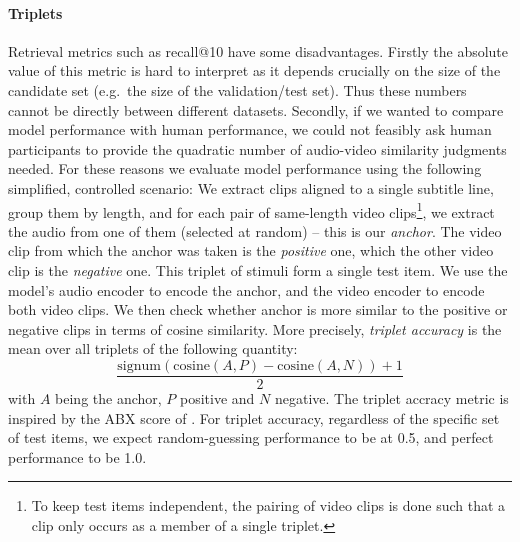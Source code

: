 \paragraph{Triplets}
Retrieval metrics such as recall@10 have some disadvantages. Firstly
the absolute value of this metric is hard to interpret as it depends
crucially on the size of the candidate set (e.g.\ the size of the
validation/test set). Thus these numbers cannot be directly between
different datasets. Secondly, if we wanted to compare model
performance with human performance, we could not feasibly ask human
participants to provide the quadratic number of audio-video similarity
judgments needed. For these reasons we evaluate model performance
using the following simplified, controlled scenario: We extract clips
aligned to a single subtitle line, group them by length, and for each
pair of same-length video clips\footnote{To keep test items
  independent, the pairing of video clips is done such that a clip
  only occurs as a member of a single triplet.}, we extract the audio
from one of them (selected at random) -- this is our {\it anchor}. The
video clip from which the anchor was taken is the {\it positive} one,
which the other video clip is the {\it negative} one. This triplet of
stimuli form a single test item.  We use the model's audio encoder to
encode the anchor, and the video encoder to encode both video
clips. We then check whether anchor is more similar to the positive or
negative clips in terms of cosine similarity.  More precisely, {\it
  triplet accuracy} is the mean over all triplets of the following
quantity:
\begin{equation}
  \frac{\mathrm{signum}(\mathrm{cosine}(A, P) - \mathrm{cosine}(A, N)) + 1}{2}
  \label{eq:triplet-acc}
\end{equation}
with $A$ being the anchor, $P$ positive and $N$ negative. The triplet
accracy metric is inspired by the ABX score of \citet{schatz2016abx}.
For triplet accuracy, regardless of the specific set of test items, we
expect random-guessing performance to be at 0.5, and perfect
performance to be 1.0.

